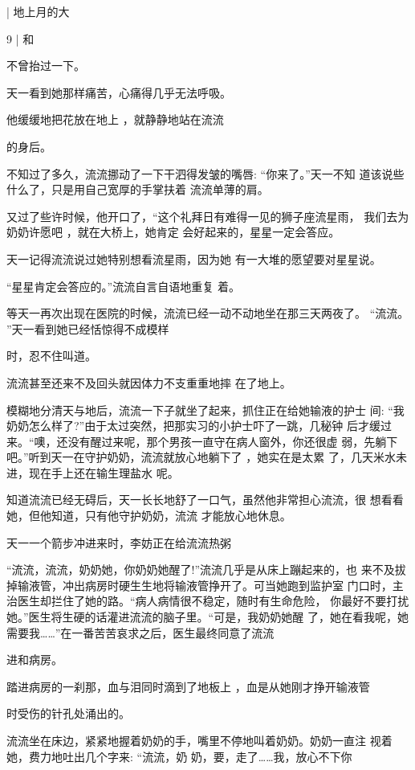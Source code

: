 \documentclass{article}
\begin{document}
|             地上月的大

9 | 和 


不曾抬过一下。 

天一看到她那样痛苦，心痛得几乎无法呼吸。

他缓缓地把花放在地上 ，就静静地站在流流
\newpage

的身后。 

不知过了多久，流流挪动了一下干泗得发皱的嘴唇: “你来了。”天一不知
道该说些什么了，只是用自己宽厚的手掌扶着
流流单薄的肩。 

又过了些许时候，他开口了，“这个礼拜日有难得一见的狮子座流星雨，
我们去为奶奶许愿吧 ，就在大桥上，她肯定
会好起来的，星星一定会答应。 

天一记得流流说过她特别想看流星雨，因为她
有一大堆的愿望要对星星说。 

“星星肯定会答应的。”流流自言自语地重复
着。 

等天一再次出现在医院的时候，流流已经一动不动地坐在那三天两夜了。
“流流。 ”天一看到她已经恬惊得不成模样
\newpage

时，忍不住叫道。 

流流甚至还来不及回头就因体力不支重重地摔
在了地上。 

模糊地分清天与地后，流流一下子就坐了起来，抓住正在给她输液的护士
间: “我奶奶怎么样了?”由于太过突然，把那实习的小护士吓了一跳，几秘钟
后才缓过来。“噢，还没有醒过来呢，那个男孩一直守在病人窗外，你还很虚
弱，先躺下吧。”听到天一在守护奶奶，流流就放心地躺下了 ，她实在是太累
了，几天米水未进，现在手上还在输生理盐水
呢。 

知道流流已经无碍后，天一长长地舒了一口气，虽然他非常担心流流，很
想看看她，但他知道，只有他守护奶奶，流流
才能放心地休息。 

\newpage

天一一个箭步冲进来时，李妨正在给流流热粥

“流流，流流，奶奶她，你奶奶她醒了!”流流几乎是从床上蹦起来的，也
来不及拔掉输液管，冲出病房时硬生生地将输液管挣开了。可当她跑到监护室
门口时，主治医生却拦住了她的路。“病人病情很不稳定，随时有生命危险，
你最好不要打扰她。”医生将生硬的话灌进流流的脑子里。“可是，我奶奶她醒
了，她在看我呢，她需要我……”在一番苦苦哀求之后，医生最终同意了流流

进和病房。 

踏进病房的一刹那，血与泪同时滴到了地板上 ，血是从她刚才挣开输液管

时受伤的针孔处涌出的。 

流流坐在床边，紧紧地握着奶奶的手，嘴里不停地叫着奶奶。奶奶一直注
视着她，费力地吐出几个字来: “流流，奶
\newpage
奶，要，走了……我，放心不下你
\end{document}
